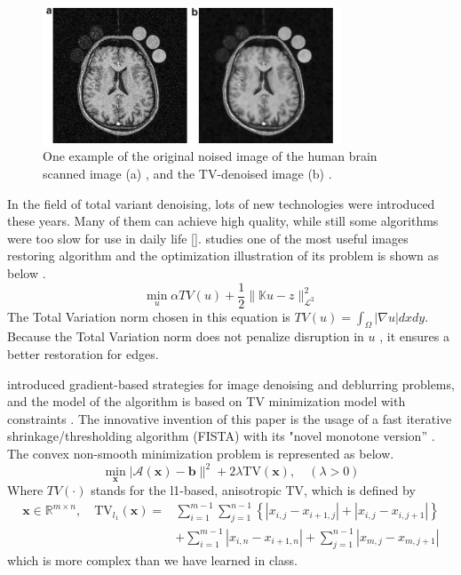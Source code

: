 \documentclass{article}
\begin{document}
\begin{figure}[h]
  \includegraphics[width=3.5in]{pic3.png}
  \centering
  \caption{One example of the original noised image of the human brain scanned image (a) , and the TV-denoised image (b) \citep{Thanh2015}.}
  \label{img3}
\end{figure}

In the field of total variant denoising, lots of new technologies were introduced these years. Many of them can achieve high quality, while still some algorithms were too slow for use in daily life []. \citet{Blomgren1997} studies  one of the most useful images restoring algorithm and the optimization illustration of its problem is shown as below \citep{Blomgren1997}.
$$
\min _{u} \alpha T V(u)+\frac{1}{2}\|\mathbb{K} u-z\|_{\mathcal{L}^{2}}^{2}
$$
The Total Variation norm chosen in this equation is $TV(u) = \int_{\Omega}|\nabla u| d x d y$. Because the Total Variation norm does not penalize disruption in $u$ , it ensures a better restoration for edges\citep{Blomgren1997}.

\citet{Beck2009}  introduced gradient-based strategies for image denoising and deblurring problems, and the model of the algorithm is based on TV minimization model with constraints \citep{Beck2009}. The innovative invention of this paper is the usage of a fast iterative shrinkage/thresholding algorithm (FISTA) with its "novel monotone version” \citep{Beck2009}. The convex non-smooth minimization problem is represented as below.
$$
\min _{\mathbf{x}}|\mathcal{A}(\mathbf{x})-\mathbf{b}\|^{2}+2 \lambda \mathrm{T} \mathrm{V}(\mathbf{x}), \quad(\lambda>0)
$$
Where $TV(·)$ stands for the l1-based, anisotropic TV, which is defined by
$$
\begin{aligned}
\mathbf{x} \in \mathbb{R}^{m \times n}, \quad \mathrm{T} \mathrm{V}_{l_{1}}(\mathbf{x})=& \sum_{i=1}^{m-1} \sum_{j=1}^{n-1}\left\{\left|x_{i, j}-x_{i+1, j}\right|+\left|x_{i, j}-x_{i, j+1}\right|\right\} \\
&+\sum_{i=1}^{m-1}\left|x_{i, n}-x_{i+1, n}\right|+\sum_{j=1}^{n-1}\left|x_{m, j}-x_{m, j+1}\right|
\end{aligned}
$$
which is more complex than we have learned in class.
\end{document}

